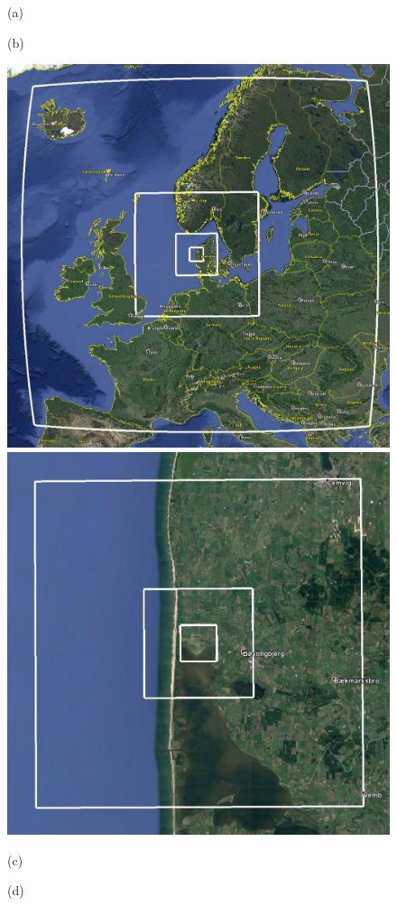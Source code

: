 \begin{figure}
	\centering
	\begin{minipage}{0.5\linewidth}
		\center \hspace{2.8cm}(a)
	\end{minipage}%
	\begin{minipage}{0.5\linewidth}
		\center\hspace{-2.8cm}(b)
	\end{minipage}%
	
	\includegraphics[width=0.3\linewidth,trim={0cm 0cm -0cm 0cm},clip,frame]{Imagenes/05/hov_dom1_edit.jpg}\hspace{0.5cm}%
	\includegraphics[width=0.3\linewidth,trim={0cm 0cm 0cm 0cm},clip,frame]{Imagenes/05/hov_dom2_edit.jpg}\vspace{0.3cm}%
	
	\begin{minipage}{0.5\linewidth}
		\center \hspace{2.4cm}(c)
	\end{minipage}%
	\begin{minipage}{0.5\linewidth}
		\center \hspace{-2.8cm}(d)
	\end{minipage}%


\end{figure}
